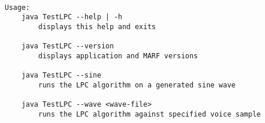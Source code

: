 \begin{verbatim}

Usage:
    java TestLPC --help | -h
        displays this help and exits

    java TestLPC --version
        displays application and MARF versions

    java TestLPC --sine
        runs the LPC algorithm on a generated sine wave

    java TestLPC --wave <wave-file>
        runs the LPC algorithm against specified voice sample

\end{verbatim}
